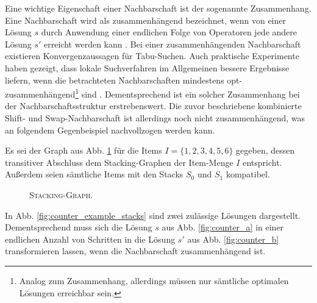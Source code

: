 Eine wichtige Eigenschaft einer Nachbarschaft ist der sogenannte Zusammenhang. Eine Nachbarschaft wird als zusammenhängend bezeichnet, wenn von einer Lösung $s$ durch Anwendung einer endlichen Folge von Operatoren jede andere Lösung $s'$ erreicht
werden kann \cite{Brucker2006}. Bei einer zusammenhängenden Nachbarschaft existieren Konvergenzaussagen für Tabu-Suchen.
Auch praktische Experimente haben gezeigt, dass lokale Suchverfahren im Allgemeinen bessere Ergebnisse
liefern, wenn die betrachteten Nachbarschaften mindestens opt-zusammenhängend\footnote{Analog zum Zusammenhang, allerdings müssen nur sämtliche optimalen Lösungen erreichbar sein.} sind \cite{Knust2017}.
Dementsprechend ist ein solcher Zusammenhang bei der Nachbarschaftsstruktur erstrebenswert.
Die zuvor beschriebene kombinierte Shift- und Swap-Nachbarschaft ist allerdings noch nicht zusammenhängend,
was an folgendem Gegenbeispiel nachvollzogen werden kann.

Es sei der Graph aus Abb. \ref{fig:counter_example_stacking_graph} für die Items $I = \{1, 2, 3, 4, 5, 6\}$ gegeben,
dessen transitiver Abschluss dem Stacking-Graphen der Item-Menge $I$ entspricht. Außerdem seien sämtliche
Items mit den Stacks $S_0$ und $S_1$ kompatibel.

\begin{figure}[H]
  \centering
  \caption{\textsc{Stacking-Graph}.}
  \label{fig:counter_example_stacking_graph}
\end{figure}

In Abb. \ref{fig:counter_example_stacks} sind zwei zulässige Lösungen dargestellt. Dementsprechend muss
sich die Lösung $s$ aus Abb. \ref{fig:counter_a} in einer endlichen Anzahl von Schritten in die Lösung $s'$ aus
Abb. \ref{fig:counter_b} transformieren lassen, wenn die Nachbarschaft zusammenhängend ist.


